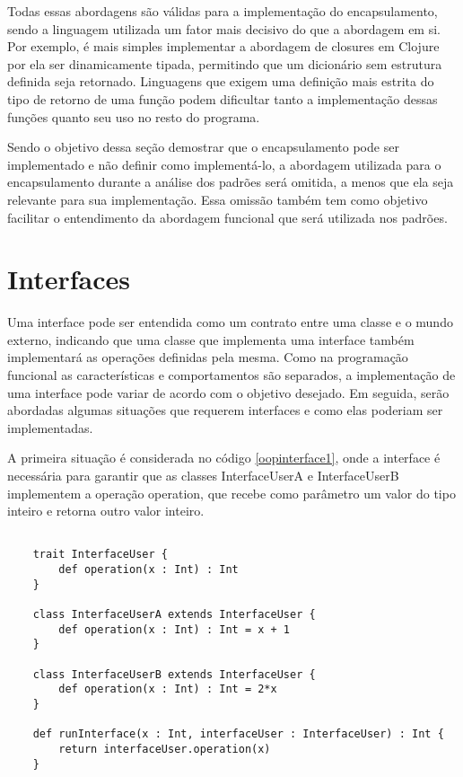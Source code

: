 Todas essas abordagens são válidas para a 
implementação do encapsulamento, sendo a 
linguagem utilizada um fator mais decisivo 
do que a abordagem em si. Por exemplo, é 
mais simples implementar a abordagem de closures 
em Clojure por ela ser dinamicamente tipada, 
permitindo que um dicionário sem estrutura 
definida seja retornado. Linguagens que exigem 
uma definição mais estrita do tipo de retorno 
de uma função podem dificultar tanto a 
implementação dessas funções quanto seu uso 
no resto do programa.

Sendo o objetivo dessa seção demostrar que 
o encapsulamento pode ser implementado e 
não definir como implementá-lo, 
a abordagem utilizada para o encapsulamento 
durante a análise dos padrões será 
omitida, a menos que ela seja relevante para 
sua implementação. Essa omissão 
também tem como objetivo facilitar o entendimento 
da abordagem funcional que será utilizada nos padrões.

\section{Interfaces}

Uma interface pode ser entendida como um contrato 
entre uma classe e o mundo externo, indicando que 
uma classe que implementa uma interface também 
implementará as operações definidas 
pela mesma\cite{oracleooconcepts}. 
Como na programação funcional 
as características e comportamentos são separados, 
a implementação de uma interface pode variar de acordo  
com o objetivo desejado. Em seguida, serão abordadas 
algumas situações que requerem interfaces e como 
elas poderiam ser implementadas.


A primeira situação é considerada no código 
\ref{oopinterface1}, 
onde a interface é necessária para garantir que as 
classes InterfaceUserA e InterfaceUserB implementem 
a operação operation, que recebe como parâmetro 
um valor do tipo inteiro e retorna outro valor 
inteiro.


\begin{lstlisting}[caption={Interfaces em Orientação a Objetos},label=oopinterface1]
    
    trait InterfaceUser {
        def operation(x : Int) : Int
    }

    class InterfaceUserA extends InterfaceUser {
        def operation(x : Int) : Int = x + 1
    }

    class InterfaceUserB extends InterfaceUser {
        def operation(x : Int) : Int = 2*x
    }

    def runInterface(x : Int, interfaceUser : InterfaceUser) : Int {
        return interfaceUser.operation(x)
    }

\end{lstlisting}

